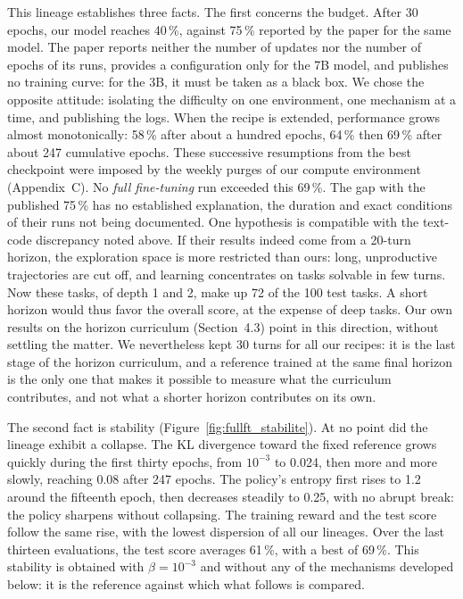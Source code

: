 \documentclass[11pt,a4paper]{article}
\begin{document}
This lineage establishes three facts. The first concerns the budget. After 30 epochs, our model reaches 40\,\%, against 75\,\% reported by the paper for the same model. The paper reports neither the number of updates nor the number of epochs of its runs, provides a configuration only for the 7B model, and publishes no training curve: for the 3B, it must be taken as a black box. We chose the opposite attitude: isolating the difficulty on one environment, one mechanism at a time, and publishing the logs. When the recipe is extended, performance grows almost monotonically: 58\,\% after about a hundred epochs, 64\,\% then 69\,\% after about 247 cumulative epochs. These successive resumptions from the best checkpoint were imposed by the weekly purges of our compute environment (Appendix~C). No \emph{full fine-tuning} run exceeded this 69\,\%. The gap with the published 75\,\% has no established explanation, the duration and exact conditions of their runs not being documented. One hypothesis is compatible with the text-code discrepancy noted above. If their results indeed come from a 20-turn horizon, the exploration space is more restricted than ours: long, unproductive trajectories are cut off, and learning concentrates on tasks solvable in few turns. Now these tasks, of depth 1 and 2, make up 72 of the 100 test tasks. A short horizon would thus favor the overall score, at the expense of deep tasks. Our own results on the horizon curriculum (Section~4.3) point in this direction, without settling the matter. We nevertheless kept 30 turns for all our recipes: it is the last stage of the horizon curriculum, and a reference trained at the same final horizon is the only one that makes it possible to measure what the curriculum contributes, and not what a shorter horizon contributes on its own.



The second fact is stability (Figure~\ref{fig:fullft_stabilite}). At no point did the lineage exhibit a collapse. The KL divergence toward the fixed reference grows quickly during the first thirty epochs, from $10^{-3}$ to 0.024, then more and more slowly, reaching 0.08 after 247 epochs. The policy's entropy first rises to 1.2 around the fifteenth epoch, then decreases steadily to 0.25, with no abrupt break: the policy sharpens without collapsing. The training reward and the test score follow the same rise, with the lowest dispersion of all our lineages. Over the last thirteen evaluations, the test score averages 61\,\%, with a best of 69\,\%. This stability is obtained with $\beta = 10^{-3}$ and without any of the mechanisms developed below: it is the reference against which what follows is compared.
\end{document}

